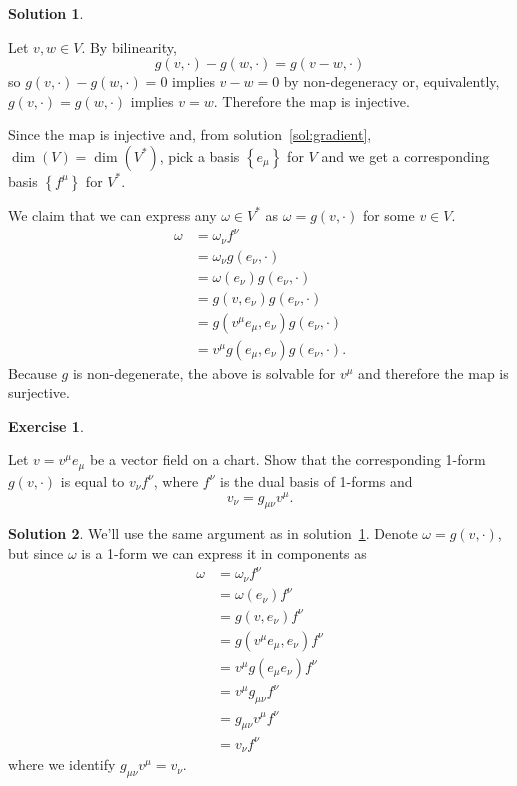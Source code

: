 \documentclass[11pt, a4paper]{article}
\theoremstyle{definition}
\newtheorem{ex}{Exercise}[part]
\newtheorem{sol}{Solution}[part]
\begin{document}
\begin{sol}\label{sol:metricisomorphism}

Let $v, w \in V$. By bilinearity,
\[
    g(v,\cdot) - g(w,\cdot) = g(v - w, \cdot)
\]
so $g(v,\cdot) - g(w,\cdot) = 0$ implies $v - w = 0$ by non-degeneracy or, equivalently, $g(v,\cdot) = g(w,\cdot)$ implies $v = w$. Therefore the map is injective.

Since the map is injective and, from solution~\ref{sol:gradient}, $\dim(V) = \dim(V^*)$, pick a basis $\left\{e_\mu\right\}$ for $V$ and we get a corresponding basis $\left\{f^\mu\right\}$ for $V^*$.

We claim that we can express any $\omega \in V^*$ as $\omega = g(v,\cdot)$ for some $v \in V$.
\begin{align*}
    \omega &= \omega_\nu f^\nu \\
           &= \omega_\nu g(e_\nu, \cdot) \\
           &= \omega(e_\nu) g(e_\nu, \cdot) \\
           &= g(v, e_\nu) g(e_\nu, \cdot) \\
           &= g(v^\mu e_\mu, e_\nu) g(e_\nu, \cdot) \\
           &= v^\mu g(e_\mu, e_\nu) g(e_\nu, \cdot).
\end{align*}
Because $g$ is non-degenerate, the above is solvable for $v^\mu$ and therefore the map is surjective.

\end{sol}

\begin{ex}\label{ex:loweringindex}

Let $v = v^\mu e_\mu$ be a vector field on a chart. Show that the corresponding 1-form $g(v, \cdot)$ is equal to $v_\nu f^\nu$, where $f^\nu$ is the dual basis of 1-forms and
\[
    v_\nu = g_{\mu\nu}v^\mu.
\]

\end{ex}

\begin{sol}

We'll use the same argument as in solution~\ref{sol:metricisomorphism}. Denote $\omega = g(v, \cdot)$, but since $\omega$ is a 1-form we can express it in components as
\begin{align*}
    \omega &= \omega_\nu f^\nu \\
           &= \omega(e_\nu) f^\nu \\
           &= g(v, e_\nu) f^\nu \\
           &= g(v^\mu e_\mu, e_\nu) f^\nu \\
           &= v^\mu g(e_\mu e_\nu) f^\nu \\
           &= v^\mu g_{\mu\nu} f^\nu \\
           &= g_{\mu\nu} v^\mu f^\nu \\
           &= v_\nu f^\nu
\end{align*}
where we identify $g_{\mu\nu}v^\mu = v_\nu$.

\end{sol}
\end{document}
